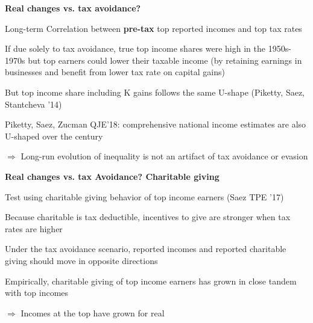 \documentclass[landscape]{slides}
\begin{document}
\begin{slide}
\begin{center}
{\bf Real changes vs. tax avoidance?}
\end{center}
Long-term Correlation between \textbf{pre-tax} top reported incomes and top tax rates

If due solely to tax avoidance, true top income shares were high in the 1950s-1970s but
top earners could lower their taxable income (by retaining earnings in businesses and benefit
from lower tax rate on capital gains)

But top income share including K gains follows the same U-shape (Piketty, Saez, Stantcheva '14)


Piketty, Saez, Zucman QJE'18: comprehensive national income estimates are also U-shaped over the century

$\Rightarrow$ Long-run evolution of inequality is not an artifact of tax avoidance or evasion

\end{slide}


\begin{slide}

\end{slide}

\begin{slide}

\end{slide}

\begin{slide}
\begin{center}
{\bf Real changes vs. tax Avoidance? Charitable giving}
\end{center}
Test using charitable giving behavior of top income earners (Saez TPE '17)

Because charitable is tax deductible, incentives to give are stronger
when tax rates are higher

Under the tax avoidance scenario, reported incomes and reported charitable
giving should move in opposite directions

Empirically, charitable giving of top income earners has grown in close tandem with
top incomes

$\Rightarrow$ Incomes at the top have grown for real 


\end{slide}
\end{document}
